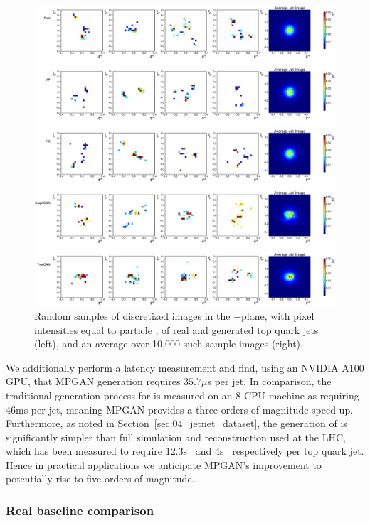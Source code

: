 \begin{figure}[htpb]
    \centering
    \centerline{\includegraphics[width=\textwidth]{figures/04-ML4Sim/mpgan/results/jet_images_t.pdf}}
    \caption{Random samples of discretized images in the \etarel$-$\phirel plane, with pixel intensities equal to particle \ptrel, of real and generated top quark jets (left), and an average over 10,000 such sample images (right).}
    \label{fig:04_mpgan_jetims_t}
\end{figure}

We additionally perform a latency measurement and find, using an NVIDIA A100 GPU, that MPGAN generation requires $35.7\mu$s per jet.
In comparison, the traditional generation process for \jetnet is measured on an 8-CPU machine as requiring 46ms per jet, meaning MPGAN provides a three-orders-of-magnitude speed-up.
Furthermore, as noted in Section~\ref{sec:04_jetnet_dataset}, the generation of \jetnet is significantly simpler than full simulation and reconstruction used at the LHC, which has been measured to require 12.3s~\cite{Pedro:2018jqu} and 4s~\cite{chen2020data} respectively per top quark jet.
Hence in practical applications we anticipate MPGAN's improvement to potentially rise to five-orders-of-magnitude.


\subsubsection{Real baseline comparison}

